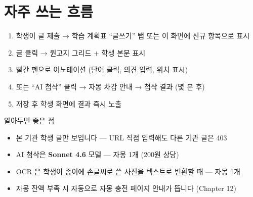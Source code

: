 \section*{자주 쓰는 흐름}
\begin{enumerate}
  \item 학생이 글 제출 → 학습 계획표 ``글쓰기'' 탭 또는 이 화면에 신규 항목으로 표시
  \item 글 클릭 → 원고지 그리드 + 학생 본문 표시
  \item 빨간 펜으로 어노테이션 (단어 클릭, 의견 입력, 위치 표시)
  \item 또는 ``AI 첨삭'' 클릭 → 자몽 차감 안내 → 첨삭 결과 (몇 분 후)
  \item 저장 후 학생 화면에 결과 즉시 노출
\end{enumerate}

\begin{tipbox}{알아두면 좋은 점}
\begin{itemize}[leftmargin=1.2em]
  \item 본 기관 학생 글만 보입니다 — URL 직접 입력해도 다른 기관 글은 403
  \item AI 첨삭은 \textbf{Sonnet 4.6} 모델 — 자몽 1개 (200원 상당)
  \item OCR 은 학생이 종이에 손글씨로 쓴 사진을 텍스트로 변환할 때 — 자몽 1개
  \item 자몽 잔액 부족 시 자동으로 자몽 충전 페이지 안내가 뜹니다 (Chapter 12)
\end{itemize}
\end{tipbox}
